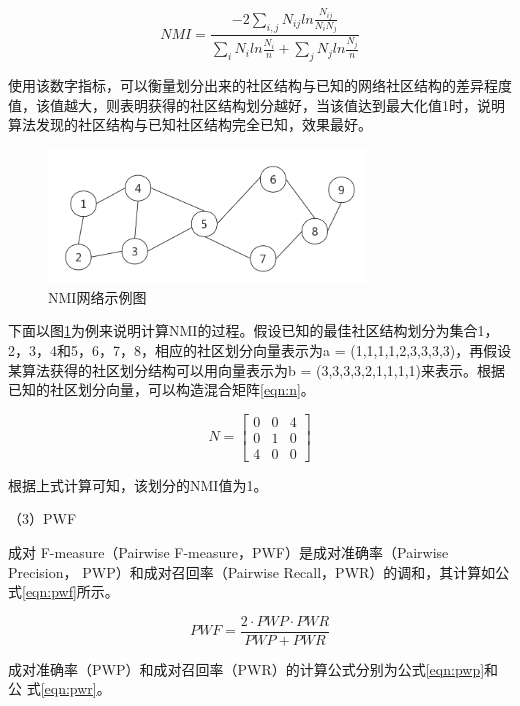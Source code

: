 \begin{equation}
  \label{eqn:nmi}
  NMI=\frac{ -2 \sum_{i,j} N_{ij}  ln{\frac{N_{ij}}{N_iN_j}} } {\sum_{i}N_iln{\frac{N_i}{n}}+\sum_{j}N_jln{\frac{N_j}{n}}}
\end{equation}

使用该数字指标，可以衡量划分出来的社区结构与已知的网络社区结构的差异程度值，该值越大，则表明获得的社区结构划分越好，当该值达到最大化值1时，说明算法发现的社区结构与已知社区结构完全已知，效果最好。

\begin{figure}
 \centering
 \includegraphics[width=0.75\textwidth]{figures/fig5-1}
 \caption{NMI网络示例图}\label{fig:fig5-1}
\end{figure}

下面以图\ref{fig:fig5-1}为例来说明计算NMI的过程。假设已知的最佳社区结构划分为集合{1，2，3，4}和{5，6，7，8}，相应的社区划分向量表示为a = (1,1,1,1,2,3,3,3,3)，再假设某算法获得的社区划分结构可以用向量表示为b = (3,3,3,3,2,1,1,1,1)来表示。根据已知的社区划分向量，可以构造混合矩阵\ref{eqn:n}。

\begin{equation}
  \label{eqn:n}
  N=\begin{bmatrix}
    0 & 0 &4 \\ 
    0 & 1 & 0\\ 
    4 & 0 & 0
    \end{bmatrix}
\end{equation}

根据上式计算可知，该划分的NMI值为1。

（3）PWF

成对 F-measure（Pairwise F-measure，PWF）是成对准确率（Pairwise Precision，
PWP）和成对召回率（Pairwise Recall，PWR）的调和，其计算如公式\ref{eqn:pwf}所示。

\begin{equation}
  \label{eqn:pwf}
  PWF=\frac{2\cdot PWP\cdot PWR}{PWP+PWR}
\end{equation}

成对准确率（PWP）和成对召回率（PWR）的计算公式分别为公式\ref{eqn:pwp}和公
式\ref{eqn:pwr}。

